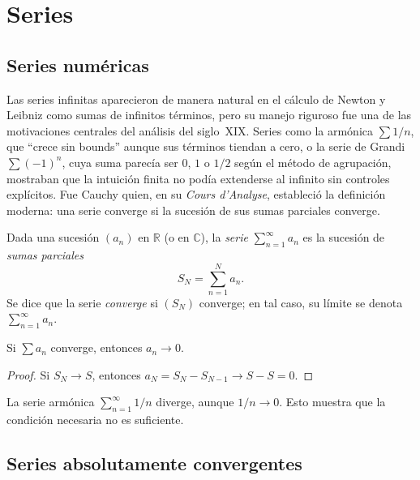 \chapter{Series}
\label{ch:series}

\section{Series numéricas}

Las series infinitas aparecieron de manera natural en el cálculo de Newton y Leibniz como sumas de infinitos términos, pero su manejo riguroso fue una de las motivaciones centrales del análisis del siglo~XIX. Series como la armónica $\sum 1/n$, que ``crece sin bounds'' aunque sus términos tiendan a cero, o la serie de Grandi $\sum (-1)^n$, cuya suma parecía ser $0$, $1$ o $1/2$ según el método de agrupación, mostraban que la intuición finita no podía extenderse al infinito sin controles explícitos. Fue Cauchy quien, en su \emph{Cours d'Analyse}, estableció la definición moderna: una serie converge si la sucesión de sus sumas parciales converge.

\begin{definition}
\label{def:serie}
Dada una sucesión $(a_n)$ en $\mathbb{R}$ (o en $\mathbb{C}$), la \emph{serie} $\sum_{n=1}^{\infty}a_n$ es la sucesión de \emph{sumas parciales}
\[
  S_N=\sum_{n=1}^{N}a_n.
\]
Se dice que la serie \emph{converge} si $(S_N)$ converge; en tal caso, su límite se denota $\sum_{n=1}^{\infty}a_n$.
\end{definition}

\begin{theorem}
\label{teo:cond-necesaria}
Si $\sum a_n$ converge, entonces $a_n\to 0$.
\end{theorem}
\begin{proof}
Si $S_N\to S$, entonces $a_N=S_N-S_{N-1}\to S-S=0$.
\end{proof}

\begin{example}
\label{ej:armonica}
La serie armónica $\sum_{n=1}^{\infty}1/n$ diverge, aunque $1/n\to 0$. Esto muestra que la condición necesaria no es suficiente.
\end{example}

\section{Series absolutamente convergentes}

